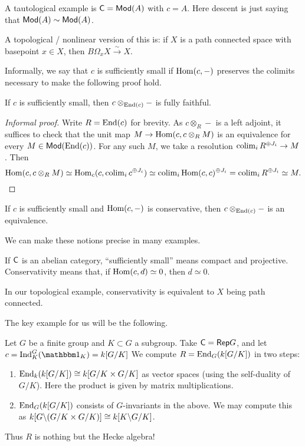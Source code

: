 \documentclass{article}
\begin{document}
\begin{ex}
	A tautological example is $\mathsf{C} = \mathsf{Mod}(A)$ with $c = A$.
	Here descent is just saying that $\mathsf{Mod}(A) \sim \mathsf{Mod}(A)$.
\end{ex}

\begin{ex}
	A topological / nonlinear version of this is: if $X$ is a path connected space with basepoint $x \in X$, then $B \Omega_x X \xrightarrow{\sim} X$.
\end{ex}

Informally, we say that $c$ is sufficiently small if $\operatorname{Hom}(c, -)$ preserves the colimits necessary to make the following proof hold.

\begin{prop}
	If $c$ is sufficiently small, then $c \otimes_{\operatorname{End}(c)} -$ is fully faithful.
\end{prop}

\begin{proof}[Informal proof]
	Write $R = \operatorname{End}(c)$ for brevity.
	As $c \otimes_R -$ is a left adjoint, it suffices to check that the unit map $M \to \operatorname{Hom}(c, c \otimes_R M)$ is an equivalence for every $M \in \mathsf{Mod}(\operatorname{End}(c))$.
	For any such $M$, we take a resolution $\operatorname{colim}_i R^{\oplus J_i} \to M$.
	Then 
	\[
		\operatorname{Hom}(c, c \otimes_R M) \simeq \operatorname{Hom}_c(c, \operatorname{colim}_i c^{\oplus J_i}) \simeq \operatorname{colim}_i \operatorname{Hom}(c, c)^{\oplus J_i} = \operatorname{colim}_i R^{\oplus J_i} \simeq M. \qedhere
	\]
\end{proof}

\begin{prop}
	If $c$ is sufficiently small and $\operatorname{Hom}(c, -)$ is conservative, then $c \otimes_{\operatorname{End}(c)} -$ is an equivalence.
\end{prop}

We can make these notions precise in many examples.

\begin{ex}
	If $\mathsf{C}$ is an abelian category, ``sufficiently small'' means compact and projective.
	Conservativity means that, if $\operatorname{Hom}(c, d) \simeq 0$, then $d \simeq 0$.
\end{ex}

\begin{ex}
	In our topological example, conservativity is equivalent to $X$ being path connected.
\end{ex}

The key example for us will be the following.

\begin{ex}
	Let $G$ be a finite group and $K \subset G$ a subgroup.
	Take $\mathsf{C} = \mathsf{Rep} G$, and let $c = \Indop_K^G(\onebb_K) = k[G / K]$
	We compute $R = \operatorname{End}_G(k[G / K])$ in two steps:
	\begin{enumerate}
		\item $\operatorname{End}_k(k[G / K]) \cong k[G / K \times G / K]$ as vector spaces (using the self-duality of $G / K$).
			Here the product is given by matrix multiplications.
		\item $\operatorname{End}_G(k[G / K])$ consists of $G$-invariants in the above.
			We may compute this as $k[G \backslash (G / K \times G / K)] \cong k[K \backslash G / K]$.
	\end{enumerate}
	Thus $R$ is nothing but the Hecke algebra!
\end{ex}
\end{document}
